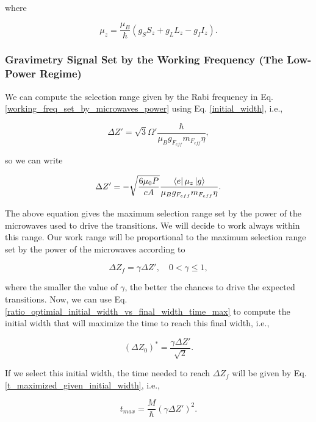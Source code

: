 \documentclass{article}
\begin{document}
where 

\begin{equation}
     \mu_{z} = \frac{\mu_{B}}{\hbar}(g_{S}S_{z} + g_{L}L_{z} - g_{I}I_{z}).
\end{equation}

\subsubsection{Gravimetry Signal Set by the Working Frequency (The Low-Power Regime)}
We can compute the selection range given by the Rabi frequency in Eq. \ref{working_freq_set_by_microwaves_power} using Eq. \ref{initial_width}, i.e.,

\begin{equation*}
\Delta Z' = \sqrt{3} \Omega' \frac{\hbar}{\mu_{B} g_{F_{eff}} m_{F_{eff}} \eta},
\end{equation*}

so we can write

\begin{equation}\label{maximum_selection_range}
\Delta Z' = - \sqrt{\frac{6 \mu_{0} P}{c A}} \frac{\bra{e} \mu_{z} \ket{g}}{\mu_{B} g_{F_{eff}} m_{F_{eff}} \eta}.
\end{equation}

The above equation gives the maximum selection range set by the power of the microwaves used to drive the transitions. We will decide to work always within this range. Our work range will be proportional to the maximum selection range set by the power of the microwaves according to

\begin{equation}\label{warning_range}
    \Delta Z_{f} = \gamma \Delta Z' \mathrm{,} \quad 0 < \gamma \leq 1,
\end{equation}

where the smaller the value of $\gamma$, the better the chances to drive the expected transitions. Now, we can use Eq. \ref{ratio_optimial_initial_width_vs_final_width_time_max} to compute the initial width that will maximize the time to reach this final width, i.e.,

\begin{equation}
    (\Delta Z_{0})^{\ast} = \frac{\gamma \Delta Z'}{\sqrt{2}}.
\end{equation}

If we select this initial width, the time needed to reach $\Delta Z_{f}$ will be given by Eq. \ref{t_maximized_given_initial_width}, i.e.,

\begin{equation}
    t_{max} = \frac{M}{\hbar} (\gamma \Delta Z')^2.
\end{equation}
\end{document}
